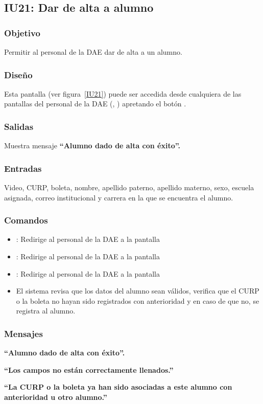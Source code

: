 
\subsection{IU21: Dar de alta a alumno}

\subsubsection{Objetivo}
	Permitir al personal de la DAE dar de alta a un alumno.
\subsubsection{Diseño}
    Esta pantalla  (ver figura~\ref{IU21}) puede ser accedida desde cualquiera de las pantallas del personal de la DAE (, ) apretando el botón .


\subsubsection{Salidas}
Muestra mensaje {\bf ``Alumno dado de alta con éxito''.}
\subsubsection{Entradas}
    Video, CURP, boleta, nombre, apellido paterno, apellido materno, sexo, escuela asignada, correo institucional y carrera en la que se encuentra el alumno.
\subsubsection{Comandos}
\begin{itemize}
	\item {}: Redirige al personal de la DAE a la pantalla 
	\item {}: Redirige al personal de la DAE a la pantalla 
	\item {}: Redirige al personal de la DAE a la pantalla 
	
    \item {}  El sistema revisa que los datos del alumno sean válidos, verifica que el CURP o la boleta no hayan sido registrados con anterioridad y en caso de que no, se registra al alumno.
    
\end{itemize}

\subsubsection{Mensajes}

\begin{Citemize}
    \item {\bf ``Alumno dado de alta con éxito''.}
    \item {\bf ``Los campos no están correctamente llenados.''}
    \item {\bf ``La CURP o la boleta ya han sido asociadas a este alumno con anterioridad u otro alumno.''}
\end{Citemize}
